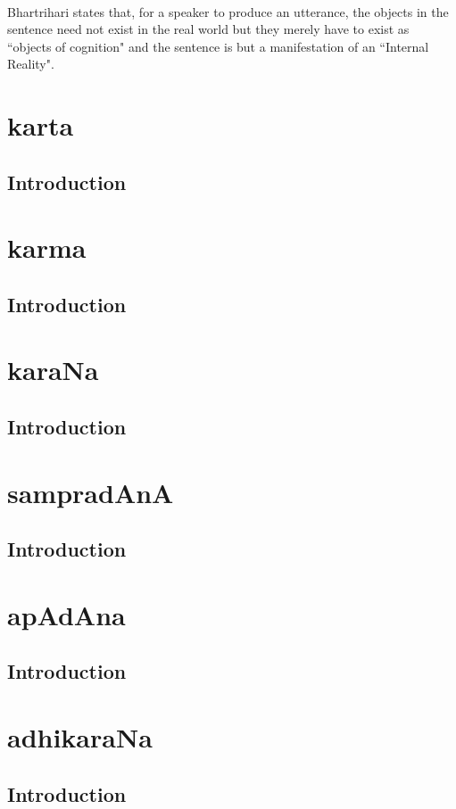 \documentclass[a4paper,10pt]{article}
\begin{document}
\paragraph{} Bhartrihari states that, for a speaker to produce an utterance, the objects in the sentence need not 
exist in the real world but they merely have to exist as ``objects of cognition" and the sentence is but a manifestation of an ``Internal Reality".

\newpage
\section{karta}
  \subsection{Introduction}
\newpage
\section{karma}
  \subsection{Introduction}
\newpage
\section{karaNa}
  \subsection{Introduction}
\newpage
\section{sampradAnA}
  \subsection{Introduction}
\newpage
\section{apAdAna}
  \subsection{Introduction}
\newpage
\section{adhikaraNa}
  \subsection{Introduction}
\newpage
\end{document}
